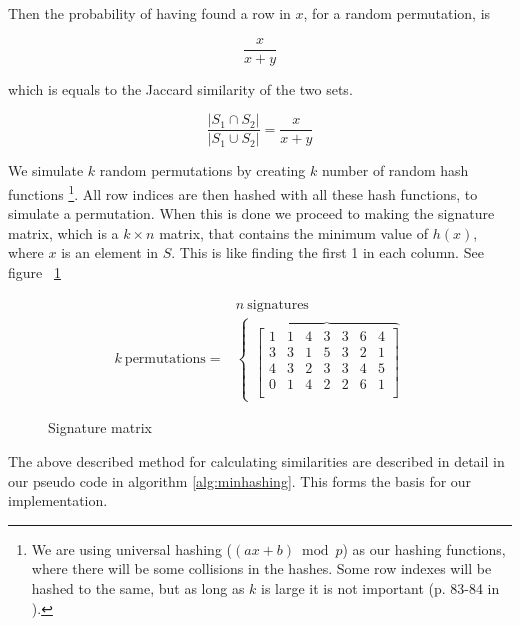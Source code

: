\documentclass[a4paper,11pt]{article}
\begin{document}
Then the probability of having found a row in $x$, for a random permutation, is

\begin{equation*}
    \frac{x}{x+y}
\end{equation*}

which is equals to the Jaccard similarity of the two sets.

\begin{equation*}
    \frac{|S_1 \cap S_2|}{|S_1 \cup S_2|} = \frac{x}{x+y}
\end{equation*}
    
We simulate $k$ random permutations by creating $k$ number of random hash functions \footnote{We are using universal hashing ($(ax + b) \bmod p$) as our hashing functions, where there will be some collisions in the hashes. Some row indexes will be hashed to the same, but as long as $k$ is large it is not important (p. 83-84 in \cite{book:mmds}).}. All row indices are then hashed with all these hash functions, to simulate a permutation. When this is done we proceed to making the signature matrix, which is a $k\times n$ matrix, that contains the minimum value of $h(x)$, where $x$ is an element in $S$. This is like finding the first 1 in each column. See figure ~\ref{fig:signature_matrix}\\

\begin{figure}[H]
    \begin{eqnarray*}
     & n \ \text{signatures} \\
     k \ \text{permutations} = & 
        \begin{cases}
        \overbrace{
        \begin{bmatrix}
            1 & 1 & 4 & 3 & 3 & 6 & 4\\
            3 & 3 & 1 & 5 & 3 & 2 & 1\\
            4 & 3 & 2 & 3 & 3 & 4 & 5\\
            0 & 1 & 4 & 2 & 2 & 6 & 1\\
        \end{bmatrix} 
        } 
        \end{cases}
    \end{eqnarray*}
    \caption{Signature matrix}
    \label{fig:signature_matrix}
\end{figure}

The above described method for calculating similarities are described in detail in our pseudo code in algorithm \ref{alg:minhashing}. This forms the basis for our implementation.
\end{document}
